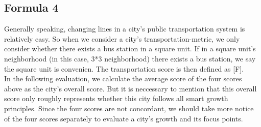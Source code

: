 \subsection{Formula 4}
Generally speaking, changing lines in a city's public transportation system is relatively easy.
So when we consider a city's transportation-metric, we only consider whether there exists a bus station in a square unit.
If in a square unit's neighborhood (in this case, 3*3 neighborhood) there exists a bus station, we say the square unit is convenien.
The transportation score is then defined as [F].
\\
In the following evaluation, we calculate the average score of the four scores above as the city's overall score.
But it is neccessary to mention that this overall score only roughly represents whether this city follows all smart growth principles.
Since the four scores are not concordant, we should take more notice of the four scores separately to evaluate a city's growth and its focus points.
\\



\printbibliography

